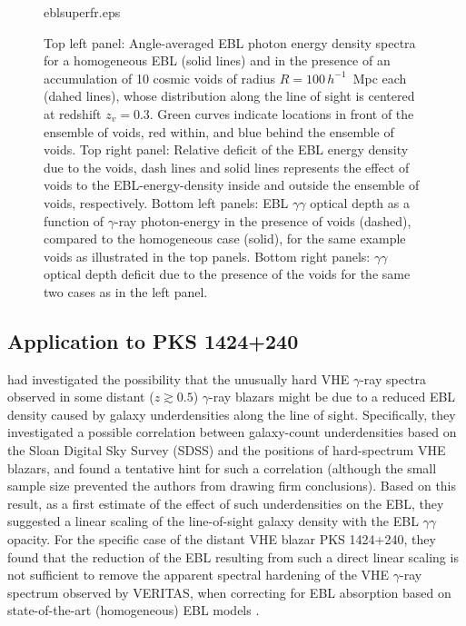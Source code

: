 \documentclass{aastex6}
\begin{document}
\begin{figure}[h]
 {eblsuperfr.eps}
\caption{Top left panel: Angle-averaged EBL photon energy density spectra for a homogeneous EBL (solid lines) 
and in the presence of an accumulation of 10 cosmic voids of radius $R = 100 \, h^{-1}$~Mpc each (dahed lines),
whose distribution along the line of sight is centered at redshift $z_v = 0.3$. 
Green curves indicate locations in front of the ensemble of voids, red within, and blue behind the ensemble
of voids. Top right panel: Relative deficit of the EBL energy density due to the voids, dash lines and solid lines 
represents the effect of voids to the EBL-energy-density inside and outside the ensemble of voids, respectively.
Bottom left panels: EBL $\gamma\gamma$ {optical depth} as a function of $\gamma$-ray photon-energy in the presence 
of voids (dashed), compared to the homogeneous case (solid), for the same example voids as illustrated in
the top panels. Bottom right panels: $\gamma\gamma$ {optical depth} deficit due to the presence 
of the voids for the same two cases as in the left panel.
\label{fig:EBLsuper} }
\end{figure}


\subsection{Application to PKS 1424+240}
\label{PKS1424}

\cite{Furniss15} had investigated the possibility that the unusually hard VHE $\gamma$-ray spectra observed
in some distant ($z \gtrsim 0.5$) $\gamma$-ray blazars might be due to a reduced EBL density caused by
galaxy underdensities along the line of sight. Specifically, they investigated a possible correlation between
galaxy-count underdensities based on the Sloan Digital Sky Survey (SDSS) and the positions of hard-spectrum
VHE blazars, and found a tentative hint for such a correlation (although the small sample size prevented the
authors from drawing firm conclusions). Based on this result, as a first estimate of the effect of such 
underdensities on the EBL, they suggested a linear scaling of the line-of-sight galaxy density with the 
EBL $\gamma\gamma$ opacity. For the specific case of the distant \citep[$z \ge 0.6$,][]{Furniss13} VHE blazar 
PKS 1424+240, they found that the reduction of the EBL resulting from such a direct linear scaling is not 
sufficient to remove the apparent spectral hardening of the VHE $\gamma$-ray spectrum observed by VERITAS, 
when correcting for EBL absorption based on state-of-the-art (homogeneous) EBL models \citep{Archambault14}. 
\end{document}
